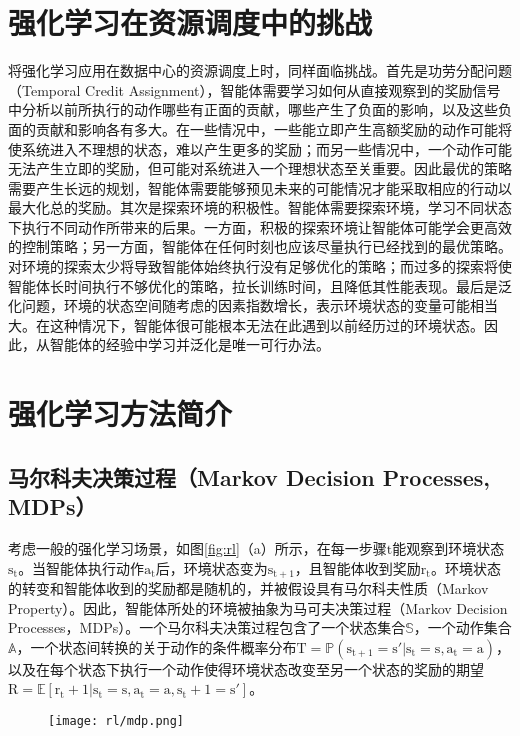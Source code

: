 \section{强化学习在资源调度中的挑战}
将强化学习应用在数据中心的资源调度上时，同样面临挑战。首先是功劳分配问题（Temporal Credit Assignment），智能体需要学习如何从直接观察到的奖励信号中分析以前所执行的动作哪些有正面的贡献，哪些产生了负面的影响，以及这些负面的贡献和影响各有多大。在一些情况中，一些能立即产生高额奖励的动作可能将使系统进入不理想的状态，难以产生更多的奖励；而另一些情况中，一个动作可能无法产生立即的奖励，但可能对系统进入一个理想状态至关重要。因此最优的策略需要产生长远的规划，智能体需要能够预见未来的可能情况才能采取相应的行动以最大化总的奖励。其次是探索环境的积极性。智能体需要探索环境，学习不同状态下执行不同动作所带来的后果。一方面，积极的探索环境让智能体可能学会更高效的控制策略；另一方面，智能体在任何时刻也应该尽量执行已经找到的最优策略。对环境的探索太少将导致智能体始终执行没有足够优化的策略；而过多的探索将使智能体长时间执行不够优化的策略，拉长训练时间，且降低其性能表现。最后是泛化问题，环境的状态空间随考虑的因素指数增长，表示环境状态的变量可能相当大。在这种情况下，智能体很可能根本无法在此遇到以前经历过的环境状态。因此，从智能体的经验中学习并泛化是唯一可行办法。

\section{强化学习方法简介}
\subsection{马尔科夫决策过程（Markov Decision Processes, MDPs）}
考虑一般的强化学习场景，如图\ref{fig:rl}（a）所示，在每一步骤$\mathrm{t}$能观察到环境状态$\mathrm{s_t}$。当智能体执行动作$\mathrm{a_t}$后，环境状态变为$\mathrm{s_{t+1}}$，且智能体收到奖励$\mathrm{r_t}$。环境状态的转变和智能体收到的奖励都是随机的，并被假设具有马尔科夫性质（Markov Property）。因此，智能体所处的环境被抽象为马可夫决策过程（Markov Decision Processes，MDPs）。一个马尔科夫决策过程包含了一个状态集合$\mathbb{S}$，一个动作集合$\mathbb{A}$，一个状态间转换的关于动作的条件概率分布$\mathrm{T=\mathbb{P}(s_{t+1}=s'|s_t=s, a_t = a)}$，以及在每个状态下执行一个动作使得环境状态改变至另一个状态的奖励的期望$\mathrm{R=\mathbb{E}[r_t+1|s_t=s, a_t=a, s_t+1=s']}$。

\begin{figure}
  \centering
  \begin{minipage}[b]{0.7\textwidth}
    \centering
    \texttt{[image: rl/mdp.png]}
    \label{fig:mdp}
  \end{minipage}     
\end{figure}

